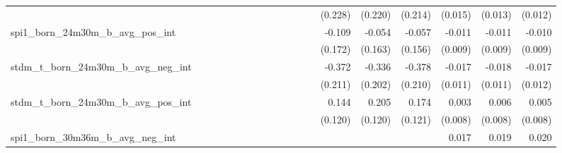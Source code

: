 \begin{tabular}{lrrrrrrrrrrrrrrrrrr}
                                            &              &              &              &              &              &              &              &              &               &              &              &               &      (0.228) &      (0.220) &       (0.214) &      (0.015) &      (0.013) &       (0.012) \\ 
spi1\_born\_24m30m\_b\_avg\_pos\_int        &              &              &              &              &              &              &              &              &               &              &              &               &       -0.109 &       -0.054 &        -0.057 &       -0.011 &       -0.011 &        -0.010 \\ 
                                            &              &              &              &              &              &              &              &              &               &              &              &               &      (0.172) &      (0.163) &       (0.156) &      (0.009) &      (0.009) &       (0.009) \\ 
stdm\_t\_born\_24m30m\_b\_avg\_neg\_int     &              &              &              &              &              &              &              &              &               &              &              &               &       -0.372 &       -0.336 &        -0.378 &       -0.017 &       -0.018 &        -0.017 \\ 
                                            &              &              &              &              &              &              &              &              &               &              &              &               &      (0.211) &      (0.202) &       (0.210) &      (0.011) &      (0.011) &       (0.012) \\ 
stdm\_t\_born\_24m30m\_b\_avg\_pos\_int     &              &              &              &              &              &              &              &              &               &              &              &               &        0.144 &        0.205 &         0.174 &        0.003 &        0.006 &         0.005 \\ 
                                            &              &              &              &              &              &              &              &              &               &              &              &               &      (0.120) &      (0.120) &       (0.121) &      (0.008) &      (0.008) &       (0.008) \\ 
spi1\_born\_30m36m\_b\_avg\_neg\_int        &              &              &              &              &              &              &              &              &               &              &              &               &              &              &               &        0.017 &        0.019 &         0.020 \\ 

\end{tabular}
